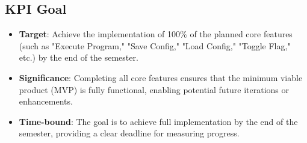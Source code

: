 \documentclass{article}
\begin{document}
\subsection{KPI Goal}

\begin{itemize}
    \item \textbf{Target}: Achieve the implementation of 100\% of the planned core features (such as "Execute Program," "Save Config," "Load Config," "Toggle Flag," etc.) by the end of the semester.
    \item \textbf{Significance}: Completing all core features ensures that the minimum viable product (MVP) is fully functional, enabling potential future iterations or enhancements.
    \item \textbf{Time-bound}: The goal is to achieve full implementation by the end of the semester, providing a clear deadline for measuring progress.
\end{itemize}
\end{document}
